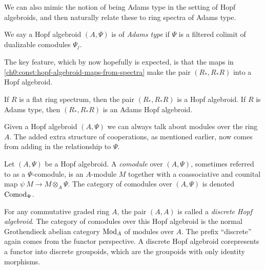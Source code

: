 We can also mimic the notion of being Adams type in the setting of Hopf algebroids, and then naturally relate these to ring spectra of Adams type. 

\begin{definition}
    \label{ch0:def:adams-hopf-algebroid}
    We say a Hopf algebroid $(A, \Psi)$ is of \emph{Adams type} if $\Psi$ is a filtered colimit of dualizable comodules $\Psi_j$. 
\end{definition}

The key feature, which by now hopefully is expected, is that the maps in \cref{ch0:const:hopf-algebroid-maps-from-spectra} make the pair $(R_*, R_*R)$ into a Hopf algebroid. 

\begin{proposition}
    \label{ch0:prop:hopf-algebroid-from-spectra}
    If $R$ is a flat ring spectrum, then the pair $(R_*, R_*R)$ is a Hopf algebroid. If $R$ is Adams type, then $(R_*, R_*R)$ is an Adams Hopf algebroid. 
\end{proposition}

Given a Hopf algebroid $(A,\Psi)$ we can always talk about modules over the ring $A$. The added extra structure of cooperations, as mentioned earlier, now comes from adding in the relationship to $\Psi$. 

\begin{definition}
    \label{ch0:def:comodule-over-hopf-algebroid}
    Let $(A, \Psi)$ be a Hopf algebroid. A \emph{comodule} over $(A, \Psi)$, sometimes referred to as a $\Psi$-comodule, is an $A$-module $M$ together with a coassociative and counital map $\psi\: M\longrightarrow M\otimes_A \Psi$. The category of comodules over $(A, \Psi)$ is denoted \emph{$\mathrm{Comod}_\Psi$}. 
\end{definition}

\begin{example}
    \label{ch0:ex:modules-as-discrete-Hopf-algebroids}
    For any commutative graded ring $A$, the pair $(A, A)$ is called a \emph{discrete Hopf algebroid}. The category of comodules over this Hopf algebroid is the normal Grothendieck  abelian category $\mathrm{Mod}_A$ of modules over $A$. The prefix ``discrete'' again comes from the functor perspective. A discrete Hopf algebroid corepresents a functor into discrete groupoids, which are the groupoids with only identity morphisms. 
\end{example}

